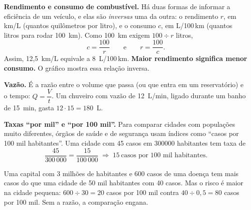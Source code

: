 \textbf{Rendimento e consumo de combustível.} Há duas formas de informar a
eficiência de um veículo, e elas são \emph{inversas} uma da outra:
o rendimento $r$, em km/L (quantos quilômetros por litro), e o consumo $c$, em
L/100\,km (quantos litros para rodar 100~km). Como 100~km exigem
$100 \div r$ litros,
\[
  c = \frac{100}{r} \qquad\text{e}\qquad r = \frac{100}{c}.
\]
Assim, 12,5~km/L equivale a 8~L/100\,km. \textbf{Maior rendimento significa
menor consumo.} O gráfico mostra essa relação inversa.

\begin{center}
\end{center}

\textbf{Vazão.} É a razão entre o volume que passa (ou que entra em um
reservatório) e o tempo: $Q = \dfrac{V}{t}$. Um chuveiro com vazão de
12~L/min, ligado durante um banho de 15~min, gasta $12 \cdot 15 = 180$~L.

\textbf{Taxas ``por mil'' e ``por 100 mil''.} Para comparar cidades com
populações muito diferentes, órgãos de saúde e de segurança usam índices como
``casos por 100 mil habitantes''. Uma cidade com 45 casos em \num{300000}
habitantes tem taxa de
\[
  \frac{45}{300\,000} = \frac{15}{100\,000} \;\Longrightarrow\; 15~\text{casos por 100 mil habitantes.}
\]

\begin{contexto}
Uma capital com 3 milhões de habitantes e 600 casos de uma doença tem mais
casos do que uma cidade de 50 mil habitantes com 40 casos. Mas o risco é maior
na cidade pequena: $600 \div 30 = 20$ casos por 100 mil contra
$40 \div 0{,}5 = 80$ casos por 100 mil. Sem a razão, a comparação engana.
\end{contexto}

